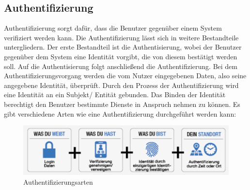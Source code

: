\documentclass[utf8,biblatex]{lni}
\begin{document}
\subsection{Authentifizierung}

Authentifizierung sorgt dafür, dass die Benutzer gegenüber einem System verifiziert werden kann.
Die Authentifizierung lässt sich in weitere Bestandteile untergliedern. Der erste Bestandteil ist die Authentisierung, 
wobei der Benutzer gegenüber dem System eine Identität vorgibt, die von diesem bestätigt werden soll. 
Auf die Authentisierung folgt anschließend die Authentifizierung. Bei dem Authentifizierungsvorgang werden die vom Nutzer 
eingegebenen Daten, also seine angegebene Identität, überprüft.  
Durch den Prozess der Authentifizierung wird eine Identität an ein Subjekt/ Entität gebunden. 
Das Binden der Identität berechtigt den Benutzer bestimmte Dienste in Anspruch nehmen zu können. \cite{Pfitzmann.}
\newline
Es gibt verschiedene Arten wie eine Authentifizierung durchgeführt werden kann:
\begin{figure}
    \centering
    \includegraphics[width=\textwidth]{images/authent_pos1.png}
    \caption[Authentifizierungsarten]{Authentifizierungsarten} 
    \label{Authentifizierungsarten}
\end{figure} 
\end{document}
